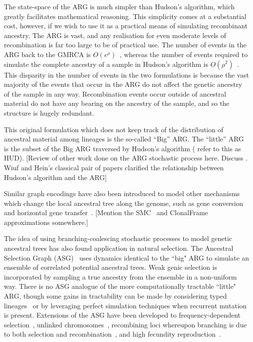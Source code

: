\documentclass{article}
\begin{document}
The state-space of the ARG is much simpler than Hudson's algorithm, which
greatly facilitates mathematical reasoning. This simplicity comes at a
substantial cost, however, if we wish to use it as a practical means of
simulating recombinant ancestry. The ARG is vast, and any realisation
for even moderate levels of recombination is far too large to be of practical
use. The number of events in the ARG back to the GMRCA
is $O(e^\rho)$~\citep{griffiths1997ancestral}, whereas the number
of events required to simulate the complete ancestry of a sample
in Hudson's algorithm is
$O(\rho^2)$~\citep[Eq.~5.10]{hein2004gene,baumdicker2021efficient}.
This disparity in the number of events in the two formulations is
because the vast majority of the events that occur in the ARG do
not affect the genetic ancestry of the sample in any way. Recombination
events occur outside of ancestral material do not have any bearing
on the ancestry of the sample, and so the structure is hugely redundant.

This original formulation which does not keep track of the distribution
of ancestral material among lineages is the so-called ``Big'' ARG.
The ``little'' ARG is the subset of the Big ARG traversed by
Hudson's algorithm (\citet{wiuf1999recombination} refer to this as HUD).
[Review of other work done on the ARG stochastic process here.
Discuss \citet{wiuf1999ancestry}. Wiuf and Hein's classical pair of papers
clarified the relationship between Hudson's algorithm and the ARG]

Similar graph encodings have also been introduced to model other mechanisms
which change the local ancestral tree along the genome, such as gene
conversion~\citep{wiuf2000coalescent} and
horizontal gene transfer~\citep{baumdicker2014infinitely}.
[Mention the
SMC~\citep{mcvean2005approximating,marjoram2006fast}
and ClonalFrame~\citep{didelot2007inference} approximations somewhere.]

The idea of using branching-coalescing stochastic processes
to model genetic ancestral trees has also found application in natural selection.
The Ancestral Selection Graph (ASG)~\citep{krone1997ancestral,neuhauser1997genealogy}
uses dynamics identical to the ``big" ARG to simulate an ensemble of correlated
potential ancestral trees. Weak genic selection is incorporated by sampling a
true ancestry from the ensemble in a non-uniform way.
There is no ASG analogue of the more computationally tractable ``little" ARG,
though some gains in tractability can be made by considering typed
lineages~\citep{etheridge2009coalescent} or by leveraging perfect simulation
techniques when recurrent mutation is present\citep{fearnhead2001perfect}.
Extensions of the ASG have been developed to frequency-dependent
selection~\citep{neuhauser1999ancestral, gonzalezcasanova2018duality},
unlinked chromosomes~\citep{fearnhead2003ancestral}, recombining
loci whereupon branching is due to both selection and
recombination~\citep{donnelly1999genealogical}, and high fecundity
reproduction~\citep{gonzalezcasanova2018duality, koskela2019robust}.
\end{document}
